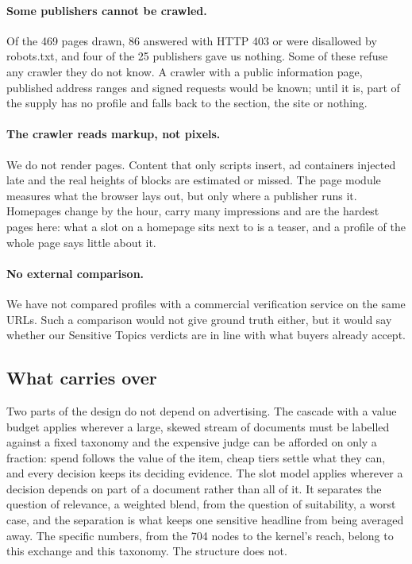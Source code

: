 \paragraph{Some publishers cannot be crawled.} Of the 469 pages drawn, 86 answered with HTTP 403 or were disallowed by robots.txt, and four of the 25 publishers gave us nothing. Some of these refuse any crawler they do not know. A crawler with a public information page, published address ranges and signed requests would be known; until it is, part of the supply has no profile and falls back to the section, the site or nothing.

\paragraph{The crawler reads markup, not pixels.} We do not render pages. Content that only scripts insert, ad containers injected late and the real heights of blocks are estimated or missed. The page module measures what the browser lays out, but only where a publisher runs it. Homepages change by the hour, carry many impressions and are the hardest pages here: what a slot on a homepage sits next to is a teaser, and a profile of the whole page says little about it.

\paragraph{No external comparison.} We have not compared profiles with a commercial verification service on the same URLs. Such a comparison would not give ground truth either, but it would say whether our Sensitive Topics verdicts are in line with what buyers already accept.

\subsection{What carries over}\label{sec:discussion-general}

Two parts of the design do not depend on advertising. The cascade with a value budget applies wherever a large, skewed stream of documents must be labelled against a fixed taxonomy and the expensive judge can be afforded on only a fraction: spend follows the value of the item, cheap tiers settle what they can, and every decision keeps its deciding evidence. The slot model applies wherever a decision depends on part of a document rather than all of it. It separates the question of relevance, a weighted blend, from the question of suitability, a worst case, and the separation is what keeps one sensitive headline from being averaged away. The specific numbers, from the 704 nodes to the kernel's reach, belong to this exchange and this taxonomy. The structure does not.

